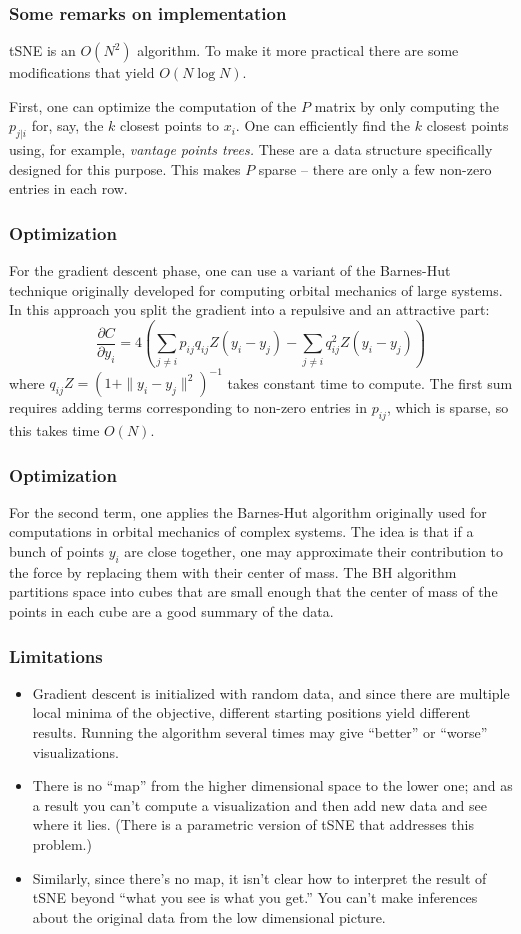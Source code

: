 \documentclass{beamer}
\begin{document}
\begin{frame}
  \frametitle{Some remarks on implementation}
  tSNE is an $O(N^2)$ algorithm.  To make it more practical there are some modifications that yield $O(N\log N)$.
  \bigskip\noindent

  First, one can optimize the computation of the $P$ matrix by only computing the $p_{j|i}$ for, say, the $k$ closest points to $x_i$.
  One can efficiently find the $k$ closest points using, for example, {\it vantage points trees.}  These are a data structure specifically
  designed for this purpose.
  \bigskip\noindent
  This makes $P$ sparse -- there are only a few non-zero entries in each row.
\end{frame}
\begin{frame}
  \frametitle{Optimization}
For the gradient descent phase, one can use a variant of the Barnes-Hut technique originally developed for computing orbital mechanics of large systems. In this approach you split the gradient into a repulsive and an attractive part:
  $$
  \frac{\partial C}{\partial y_i} = 4 (\sum_{j\not=i}p_{ij}q_{ij}Z(y_i-y_j)-\sum_{j\not=i}q_{ij}^2Z(y_i-y_j))
  $$
  where $q_{ij}Z=(1+\|y_i-y_j\|^2)^{-1}$ takes constant time to compute.
  \bigskip\noindent
  The first sum requires adding terms corresponding to non-zero entries in $p_{ij}$, which is sparse, so this takes time $O(N)$.
 \end{frame}
 \begin{frame}
   \frametitle{Optimization}
   For the second term, one applies the Barnes-Hut algorithm originally used for computations in orbital mechanics of complex systems.  The idea is
   that if a bunch of points $y_i$ are close together, one may approximate their contribution to the force by replacing them with their
   center of mass.
   \bigskip\noindent
   The BH algorithm partitions space into cubes that are small enough that the center of mass of the points in each cube are a good summary of the data.
 \end{frame}
 \begin{frame}
   \frametitle{Limitations}
   \begin{itemize}
   \item Gradient descent is initialized with random data, and since there are multiple local minima of the objective, different starting positions yield different results.  Running the algorithm several times may give ``better'' or ``worse'' visualizations.
   \item There is no ``map'' from the higher dimensional space to the lower one; and as a result you can't compute a visualization and then add new data and see where it lies.  (There is a parametric version of tSNE that addresses this problem.)
   \item Similarly, since there's no map, it isn't clear how to interpret the result of tSNE beyond ``what you see is what you get.''  You can't make inferences about the original data from the low dimensional picture.
   \end{itemize}
 \end{frame}
\end{document}
